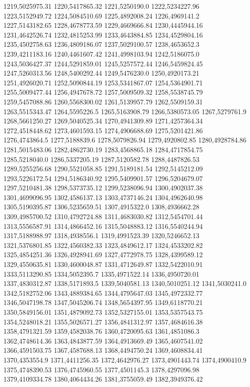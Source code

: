 1219,5025975.31
1220,5417865.32
1221,5250190.0
1222,5234227.96
1223,5152949.72
1224,5084510.69
1225,4892008.24
1226,4969141.2
1227,5143182.65
1228,4678773.59
1229,4669666.84
1230,4445944.16
1231,4642526.74
1232,4815253.99
1233,4643884.85
1234,4529804.16
1235,4502758.63
1236,4809186.07
1237,5029100.57
1238,4653652.3
1239,4211183.16
1240,4461607.42
1241,4998103.94
1242,5186075.0
1243,5036427.37
1244,5291859.01
1245,5257572.44
1246,5459824.45
1247,5260313.56
1248,5400292.44
1249,5476230.0
1250,4920173.21
1251,4926020.71
1252,5090844.19
1253,5341867.07
1254,5364901.71
1255,5009477.44
1256,4947678.72
1257,5009509.32
1258,5538745.79
1259,5457088.86
1260,5568300.02
1261,5139957.79
1262,5509159.31
1263,5515343.47
1264,5595226.5
1265,5163908.79
1266,5380573.05
1267,5279761.9
1268,5661250.27
1269,5040525.34
1270,4941309.89
1271,4257364.34
1272,4518448.62
1273,4601593.15
1274,4906688.69
1275,5201421.86
1276,4743864.5
1277,5188839.6
1278,5079826.94
1279,4920802.85
1280,4928784.86
1281,5015483.06
1282,4862730.19
1283,4568865.18
1284,4717854.75
1285,5218040.0
1286,5337205.19
1287,5120582.78
1288,4487826.53
1289,5255256.68
1290,5521058.85
1291,5189181.54
1292,5145212.09
1293,5226172.54
1294,5186340.92
1295,5409901.57
1296,5204679.07
1297,5210481.38
1298,5373735.12
1299,5238096.94
1300,4902037.38
1301,4699096.95
1302,4586137.13
1303,4737146.24
1304,4962640.98
1305,5190395.87
1306,5235659.51
1307,4915322.0
1308,4936662.28
1309,4985700.52
1310,4792724.88
1311,4683030.82
1312,5454701.44
1313,5556587.91
1314,4866452.16
1315,5048883.12
1316,5540244.94
1317,5188988.97
1318,4938556.1
1319,4991523.39
1320,5246652.13
1321,5376801.85
1322,4560382.33
1323,4849612.17
1324,4533202.82
1325,4854251.36
1326,4928941.69
1327,4772978.75
1328,4399589.12
1329,4550635.81
1330,4600048.87
1331,4712649.87
1332,5422010.91
1333,5113290.85
1334,5052395.7
1335,4971522.14
1336,4950720.01
1337,4830312.87
1338,5171893.5
1339,5040581.13
1340,5010251.12
1341,5030241.0
1342,5182752.06
1343,4889384.65
1344,4795647.03
1345,4972332.77
1346,5047198.78
1347,5045206.74
1348,5654397.95
1349,6118770.21
1350,5849156.01
1351,4879092.73
1352,5327155.01
1353,5357543.75
1354,5248018.21
1355,5026571.27
1356,4841312.97
1357,4684616.38
1358,4791321.59
1359,4582038.76
1360,4720095.63
1361,4851086.3
1362,4748614.36
1363,4843877.59
1364,4913669.49
1365,4607541.02
1366,4591503.75
1367,4587688.13
1368,4494750.24
1369,4608834.41
1370,4353554.9
1371,4411256.35
1372,4642976.27
1373,4901443.74
1374,4900410.9
1375,4748390.53
1376,4745960.55
1377,4501145.3
1378,4297096.98
1379,4109334.78
1380,4064434.26
1381,3755059.49
1382,3949376.42
